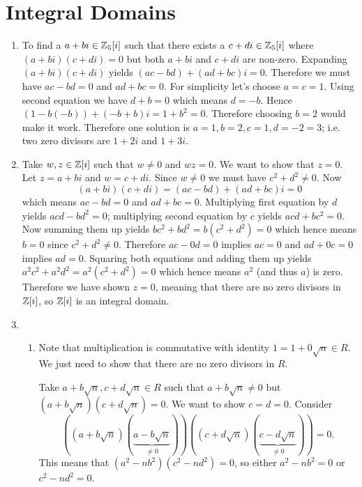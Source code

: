 \section{Integral Domains}
\begin{enumerate}
    \item To find a $a+bi \in \mathbb{Z}_{5}[i]$ such that there exists a $c+di \in \mathbb{Z}_{5}[i]$ where $(a+bi)(c+di) = 0$ but both $a+bi$ and $c+di$ are non-zero. Expanding $(a+bi)(c+di)$ yields $(ac-bd)+(ad+bc)i = 0$. Therefore we must have $ac-bd = 0$ and $ad+bc = 0$. For simplicity let's choose $a=c=1$. Using second equation we have $d+b = 0$ which means $d = -b$. Hence $(1 - b(-b))+(-b + b)i = 1+b^2 = 0$. Therefore choosing $b = 2$ would make it work. Therefore one solution is $a = 1, b = 2, c = 1, d = -2 = 3$; i.e. two zero divisors are $1+2i$ and $1+3i$.
    
    \item Take $w, z \in \mathbb{Z}[i]$ such that $w \neq 0$ and $wz = 0$. We want to show that $z = 0$. Let $z = a+bi$ and $w = c+di$. Since $w \neq 0$ we must have $c^2+d^2 \neq 0$. Now
    \[
        (a+bi)(c+di) = (ac-bd)+(ad+bc)i = 0
    \]
    which means $ac - bd = 0$ and $ad+bc = 0$. Multiplying first equation by $d$ yields $acd - bd^2 = 0$; multiplying second equation by $c$ yields $acd + bc^2 = 0$. Now summing them up yields $bc^2+bd^2 = b(c^2+d^2) = 0$ which hence means $b = 0$ since $c^2+d^2 \neq 0$. Therefore $ac - 0d = 0$ implies $ac = 0$ and $ad+0c = 0$ implies $ad = 0$. Squaring both equations and adding them up yields $a^2c^2 + a^2d^2 = a^2(c^2+d^2) = 0$ which hence means $a^2$ (and thus $a$) is zero. Therefore we have shown $z = 0$, meaning that there are no zero divisors in $\mathbb{Z}[i]$, so $\mathbb{Z}[i]$ is an integral domain.

    \item \begin{enumerate}[label=(\alph*)]
        \item Note that multiplication is commutative with identity $1 = 1 + 0\sqrt{n} \in R$. We just need to show that there are no zero divisors in $R$.
        
        Take $a+b\sqrt n, c+d\sqrt n \in R$ such that $a+b\sqrt n \neq 0$ but $(a+b\sqrt n)(c+d\sqrt n) = 0$. We want to show $c = d = 0$. Consider
        \[
            \left((a+b\sqrt n)(\underbrace{a-b\sqrt n}_{\neq 0})\right)\left((c+d\sqrt n)(\underbrace{c-d\sqrt n}_{\neq 0})\right) = 0.
        \]
        This means that $(a^2-nb^2)(c^2-nd^2) = 0$, so either $a^2-nb^2 = 0$ or $c^2-nd^2 = 0$.


\end{enumerate}
\end{enumerate}

